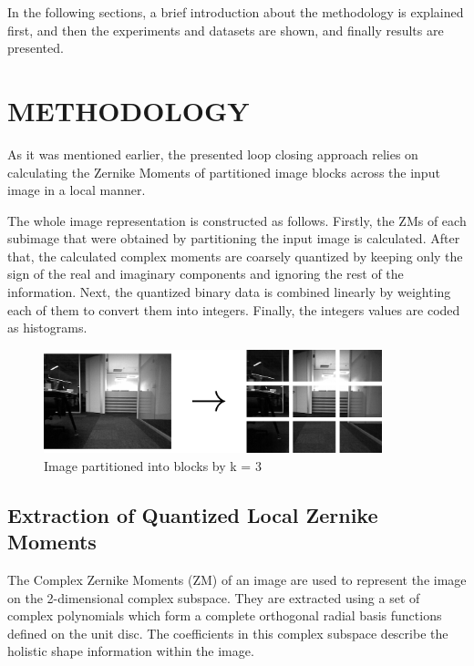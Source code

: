 \documentclass[]{spie}  %
\begin{document}
In the following sections, a brief introduction about the methodology is explained first, and then the experiments and datasets are shown, and finally results are presented. 


\section{METHODOLOGY}
\label{sec:method}

As it was mentioned earlier, the presented loop closing approach relies on calculating the Zernike Moments of partitioned image blocks across the input image in a local manner. 

The whole image representation is constructed as follows. Firstly, the ZMs of each subimage that were obtained by partitioning the input image is calculated. After that, the calculated complex moments are coarsely quantized by keeping only the sign of the real and imaginary components and ignoring the rest of the information. Next, the quantized binary data is combined linearly by weighting each of them to convert them into integers. Finally, the integers values are coded as histograms.

\begin{figure}[!htb]
        \centering
        \includegraphics[trim = 0mm 0mm 0mm 0mm, clip, height=3cm]{figures/divided_image.png}    
        \vspace{3mm}
        \caption{Image partitioned into blocks by k = 3}
        \label{fig:divided_image}
\end{figure}

\subsection{Extraction of Quantized Local Zernike Moments} 

The Complex Zernike Moments (ZM) of an image are used to represent the image on the 2-dimensional complex subspace. They are extracted using a set of complex polynomials which form a complete orthogonal radial basis functions defined on the unit disc. The coefficients in this complex subspace describe the holistic shape information within the image. 
\end{document}

